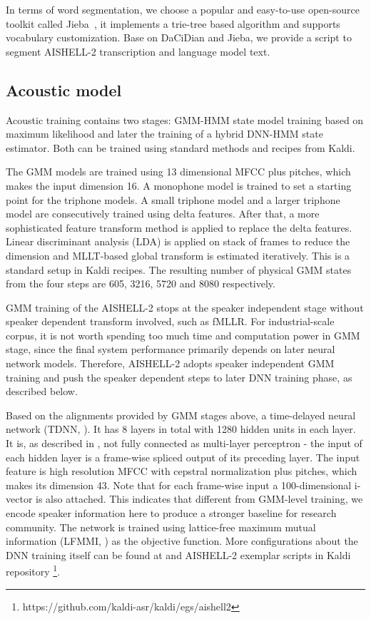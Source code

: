 \documentclass[a4paper]{article}
\begin{document}
In terms of word segmentation, we choose a popular and easy-to-use open-source
toolkit called Jieba~\cite{jieba}, it implements a trie-tree based algorithm and
supports vocabulary customization.  Base on DaCiDian and Jieba, we provide a
script to segment AISHELL-2 transcription and language model text.

\subsection{Acoustic model}

Acoustic training contains two stages: GMM-HMM state model training based on maximum likelihood and later the training of a hybrid DNN-HMM state estimator. Both can be trained using standard methods and recipes from Kaldi.

The GMM models are trained using 13 dimensional MFCC plus pitches, which makes the input dimension 16.
A monophone model is trained to set a starting point for the triphone models. A small triphone model and a larger triphone model are consecutively trained using delta features. After that, a more sophisticated feature transform method is applied to replace the delta features. Linear discriminant analysis (LDA) is applied on stack of frames to reduce the dimension and MLLT-based global transform is estimated iteratively. This is a standard setup in Kaldi recipes. The resulting number of physical GMM states from the four steps are 605, 3216, 5720 and 8080 respectively.

GMM training of the AISHELL-2 stops at the speaker independent stage without speaker dependent transform involved, such as fMLLR. For industrial-scale corpus, it is not worth spending too much time and computation power in GMM stage, since the final system performance primarily depends on later neural network models. Therefore, AISHELL-2 adopts speaker independent GMM training and push the speaker dependent steps to later DNN training phase, as described below.

Based on the alignments provided by GMM stages above, a time-delayed neural network (TDNN, \cite{tdnn}). It has 8 layers in total with 1280 hidden units in each layer. It is, as described in \cite{tdnn}, not fully connected as multi-layer perceptron - the input of each hidden layer is a frame-wise spliced output of its preceding layer. The input feature is high resolution MFCC with cepstral normalization plus pitches, which makes its dimension 43. Note that for each frame-wise input a 100-dimensional i-vector is also attached. This indicates that different from GMM-level training, we encode speaker information here to produce a stronger baseline for research community. The network is trained using lattice-free maximum mutual information (LFMMI, \cite{lfmmi}) as the objective function. More configurations about the DNN training itself can be found at \cite{lfmmi} and AISHELL-2 exemplar scripts in Kaldi repository \footnote{https://github.com/kaldi-asr/kaldi/egs/aishell2}.
\end{document}
